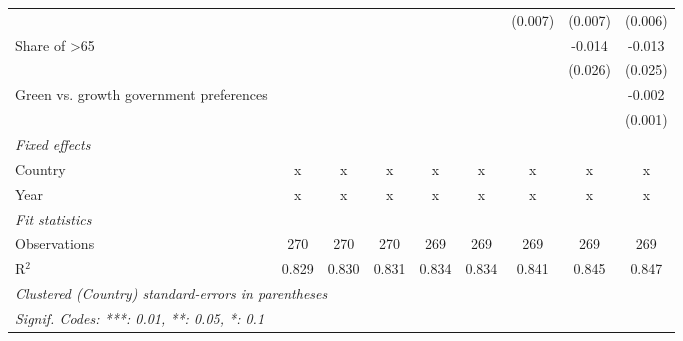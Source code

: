 \begin{table}[htbp]
\begin{tabular}{lcccccccc}
                                                   &         &         &         &         &         & (0.007) & (0.007) & (0.006)\\   
      Share of >65                                 &         &         &         &         &         &         & -0.014  & -0.013\\   
                                                   &         &         &         &         &         &         & (0.026) & (0.025)\\   
      Green vs. growth government preferences      &         &         &         &         &         &         &         & -0.002\\   
                                                   &         &         &         &         &         &         &         & (0.001)\\   
      \emph{Fixed effects}\\
      Country                                      & x       & x       & x       & x       & x       & x       & x       & x\\  
      Year                                         & x       & x       & x       & x       & x       & x       & x       & x\\  
      \midrule \emph{Fit statistics}\\
      Observations                                 & 270     & 270     & 270     & 269     & 269     & 269     & 269     & 269\\  
      R$^2$                                        & 0.829   & 0.830   & 0.831   & 0.834   & 0.834   & 0.841   & 0.845   & 0.847\\  
      \midrule
      \multicolumn{9}{l}{\emph{Clustered (Country) standard-errors in parentheses}}\\
      \multicolumn{9}{l}{\emph{Signif. Codes: ***: 0.01, **: 0.05, *: 0.1}}\\
   \end{tabular}
\end{table}


